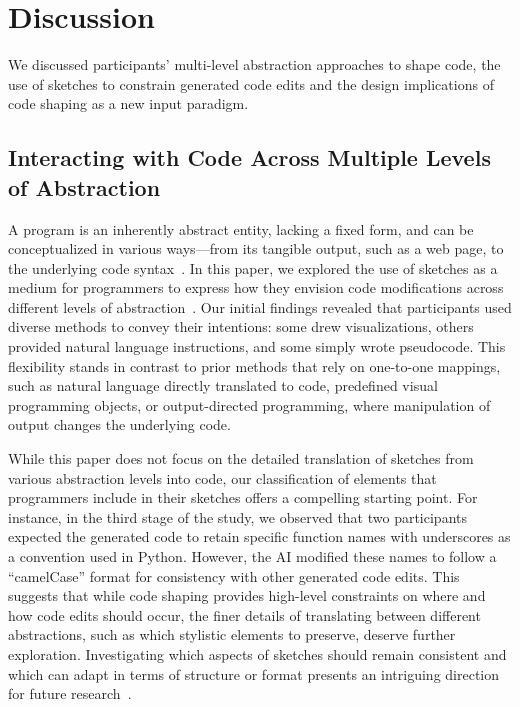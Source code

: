 \section{Discussion}
We discussed participants' multi-level abstraction approaches to shape code, the use of sketches to constrain generated code edits and the design implications of code shaping as a new input paradigm.

\subsection{Interacting with Code Across Multiple Levels of Abstraction}
A program is an inherently abstract entity, lacking a fixed form, and can be conceptualized in various ways—from its tangible output, such as a web page, to the underlying code syntax~\cite{hartmanis1994turing}. 
In this paper, we explored the use of sketches as a medium for programmers to express how they envision code modifications across different levels of abstraction~\cite{10.1145/3526113.3545617, 9127262, 10.1145/3654777.3676357}.
Our initial findings revealed that participants used diverse methods to convey their intentions: some drew visualizations, others provided natural language instructions, and some simply wrote pseudocode. This flexibility stands in contrast to prior methods that rely on one-to-one mappings, such as natural language directly translated to code, predefined visual programming objects, or output-directed programming, where manipulation of output changes the underlying code. 


While this paper does not focus on the detailed translation of sketches from various abstraction levels into code, our classification of elements that programmers include in their sketches offers a compelling starting point. 
For instance, in the third stage of the study, we observed that two participants expected the generated code to retain specific function names with underscores as a convention used in Python. However, the AI modified these names to follow a ``camelCase'' format for consistency with other generated code edits. This suggests that while code shaping provides high-level constraints on where and how code edits should occur, the finer details of translating between different abstractions, such as which stylistic elements to preserve, deserve further exploration. Investigating which aspects of sketches should remain consistent and which can adapt in terms of structure or format presents an intriguing direction for future research~\cite{bff9b250-7640-39e2-8f34-329fd1552822}.

